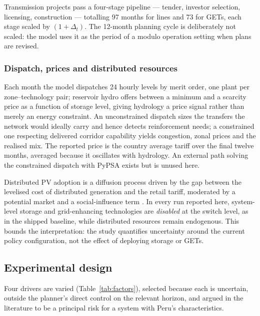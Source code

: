 Transmission projects pass a four-stage pipeline --- tender, investor selection,
licensing, construction --- totalling 97 months for lines and 73 for GETs, each stage
scaled by $(1+\Delta_t)$. The 12-month planning cycle is deliberately not scaled: the
model uses it as the period of a modulo operation setting when plans are revised.

\subsubsection{Dispatch, prices and distributed resources}
\label{sec:method:dispatch}

Each month the model dispatches 24 hourly levels by merit order, one plant per
zone--technology pair; reservoir hydro offers between a minimum and a scarcity price as
a function of storage level, giving hydrology a price signal rather than merely an
energy constraint. An unconstrained dispatch sizes the transfers the network would
ideally carry and hence detects reinforcement needs; a constrained one respecting
delivered corridor capability yields congestion, zonal prices and the realised mix. The
reported price is the country average tariff over the final twelve months, averaged
because it oscillates with hydrology. An external path solving the constrained dispatch
with PyPSA \citep{brown2018} exists but is unused here.

Distributed PV adoption is a diffusion process driven by the gap between the levelised
cost of distributed generation and the retail tariff, moderated by a potential market
and a social-influence term \citep{oyarzun2026,antoniolli2022,wu2025}. In every run
reported here, system-level storage and grid-enhancing technologies are \emph{disabled}
at the switch level, as in the shipped baseline, while distributed resources remain
endogenous. This bounds the interpretation: the study quantifies uncertainty around the
current policy configuration, not the effect of deploying storage or GETs.

\subsection{Experimental design}
\label{sec:method:design}

Four drivers are varied (Table~\ref{tab:factors}), selected because each is uncertain,
outside the planner's direct control on the relevant horizon, and argued in the
literature to be a principal risk for a system with Peru's characteristics.

